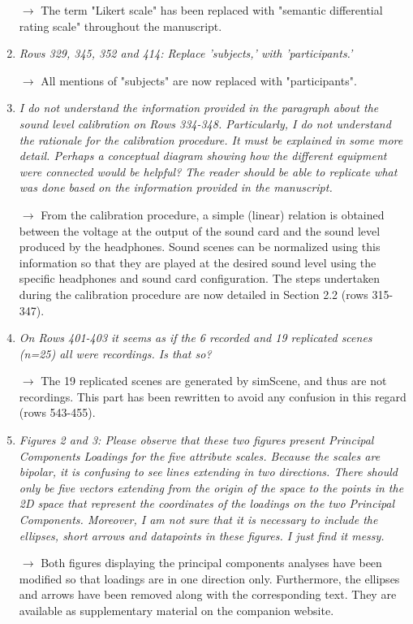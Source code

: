 \documentclass[10pt]{article}
\begin{document}
\begin{enumerate}
$\rightarrow$ The term "Likert scale" has been replaced with "semantic differential rating scale" throughout the manuscript.

\item \emph{Rows 329, 345, 352 and 414: Replace 'subjects,' with 'participants.'}

$\rightarrow$ All mentions of "subjects" are now replaced with "participants".

\item \emph{I do not understand the information provided in the paragraph about the sound level calibration on Rows 334-348. Particularly, I do not understand the rationale for the calibration procedure. It must be explained in some more detail. Perhaps a conceptual diagram showing how the different equipment were connected would be helpful? The reader should be able to replicate what was done based on the information provided in the manuscript.}

$\rightarrow$ From the calibration procedure, a simple (linear) relation is obtained between the voltage at the output of the sound card and the sound level produced by the headphones. Sound scenes can be normalized using this information so that they are played at the desired sound level using the specific headphones and sound card configuration. The steps undertaken during the calibration procedure are now detailed in Section 2.2 (rows 315-347). 

\item \emph{On Rows 401-403 it seems as if the 6 recorded and 19 replicated scenes (n=25) all were recordings. Is that so?}

$\rightarrow$ The 19 replicated scenes are generated by simScene, and thus are not recordings. This part has been rewritten to avoid any confusion in this regard (rows 543-455).

\item \emph{Figures 2 and 3: Please observe that these two figures present Principal Components Loadings for the five attribute scales. Because the scales are bipolar, it is confusing to see lines extending in two directions. There should only be five vectors extending from the origin of the space to the points in the 2D space that represent the coordinates of the loadings on the two Principal Components. Moreover, I am not sure that it is necessary to include the ellipses, short arrows and datapoints in these figures. I just find it messy.}

$\rightarrow$ Both figures displaying the principal components analyses have been modified so that loadings are in one direction only. Furthermore, the ellipses and arrows have been removed along with the corresponding text. They are available as supplementary material on the companion website.


\end{enumerate}
\end{document}
